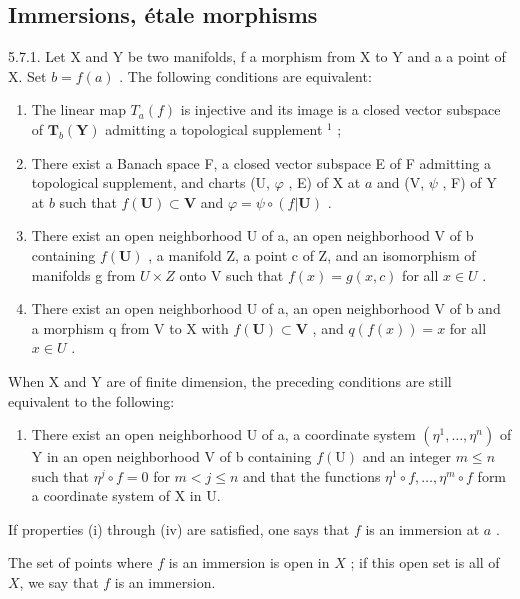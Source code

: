 \subsection{Immersions, étale morphisms}

5.7.1. Let X and Y be two manifolds, f a morphism from X to Y and a a point of X. Set \(b = f(a)\) . The following conditions are equivalent:

\begin{enumerate}
\def\labelenumi{(\roman{enumi})}
\item
  The linear map \(T_{a}(f)\) is injective and its image is a closed vector subspace of \(\mathbf{T}_{b}(\mathbf{Y})\) admitting a topological supplement \(^{1}\) ;
\item
  There exist a Banach space F, a closed vector subspace E of F admitting a topological supplement, and charts (U, \(\varphi\) , E) of X at \(a\) and (V, \(\psi\) , F) of Y at \(b\) such that \(f(\mathbf{U}) \subset \mathbf{V}\) and \(\varphi = \psi \circ (f|\mathbf{U})\) .
\item
  There exist an open neighborhood U of a, an open neighborhood V of b containing \(f(\mathbf{U})\) , a manifold Z, a point c of Z, and an isomorphism of manifolds g from \(U \times Z\) onto V such that \(f(x) = g(x, c)\) for all \(x \in U\) .
\item
  There exist an open neighborhood U of a, an open neighborhood V of b and a morphism q from V to X with \(f(\mathbf{U}) \subset \mathbf{V}\) , and \(q(f(x)) = x\) for all \(x \in U\) .
\end{enumerate}

When X and Y are of finite dimension, the preceding conditions are still equivalent to the following:

\begin{enumerate}
\def\labelenumi{(\alph{enumi})}
\setcounter{enumi}{21}
\tightlist
\item
  There exist an open neighborhood U of a, a coordinate system \((\eta^{1},\ldots,\eta^{n})\) of Y in an open neighborhood V of b containing \(f(\mathrm{U})\) and an integer \(m\leqslant n\) such that \(\eta^{j}\circ f=0\) for \(m<j\leqslant n\) and that the functions \(\eta^{1}\circ f,\ldots,\eta^{m}\circ f\) form a coordinate system of X in U.
\end{enumerate}

If properties (i) through (iv) are satisfied, one says that \(f\) is an immersion at \(a\) .

The set of points where \(f\) is an immersion is open in \(X\) ; if this open set is all of \(X\), we say that \(f\) is an immersion.

